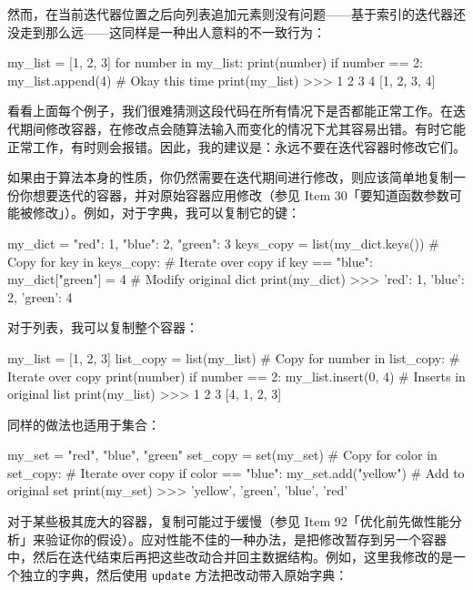 然而，在当前迭代器位置之后向列表追加元素则没有问题——基于索引的迭代器还没走到那么远——这同样是一种出人意料的不一致行为：

\begin{codebox}[python]
my_list = [1, 2, 3]
for number in my_list:
    print(number)
    if number == 2:
        my_list.append(4)  # Okay this time
print(my_list)
>>>
1
2
3
4
[1, 2, 3, 4]
\end{codebox}

看看上面每个例子，我们很难猜测这段代码在所有情况下是否都能正常工作。在迭代期间修改容器，在修改点会随算法输入而变化的情况下尤其容易出错。有时它能正常工作，有时则会报错。因此，我的建议是：永远不要在迭代容器时修改它们。

如果由于算法本身的性质，你仍然需要在迭代期间进行修改，则应该简单地复制一份你想要迭代的容器，并对原始容器应用修改（参见 Item 30「要知道函数参数可能被修改」）。例如，对于字典，我可以复制它的键：

\begin{codebox}[python]
my_dict = {"red": 1, "blue": 2, "green": 3}
keys_copy = list(my_dict.keys())  # Copy
for key in keys_copy:             # Iterate over copy
    if key == "blue":
        my_dict["green"] = 4      # Modify original dict
print(my_dict)
>>>
{'red': 1, 'blue': 2, 'green': 4}
\end{codebox}

对于列表，我可以复制整个容器：

\begin{codebox}[python]
my_list = [1, 2, 3]
list_copy = list(my_list)     # Copy
for number in list_copy:      # Iterate over copy
    print(number)
    if number == 2:
        my_list.insert(0, 4)  # Inserts in original list
print(my_list)
>>>
1
2
3
[4, 1, 2, 3]
\end{codebox}

同样的做法也适用于集合：

\begin{codebox}[python]
my_set = {"red", "blue", "green"}
set_copy = set(my_set)        # Copy
for color in set_copy:        # Iterate over copy
    if color == "blue":
        my_set.add("yellow")  # Add to original set
print(my_set)
>>>
{'yellow', 'green', 'blue', 'red'}
\end{codebox}

对于某些极其庞大的容器，复制可能过于缓慢（参见 Item 92「优化前先做性能分析」来验证你的假设）。应对性能不佳的一种办法，是把修改暂存到另一个容器中，然后在迭代结束后再把这些改动合并回主数据结构。例如，这里我修改的是一个独立的字典，然后使用 \texttt{update} 方法把改动带入原始字典：

